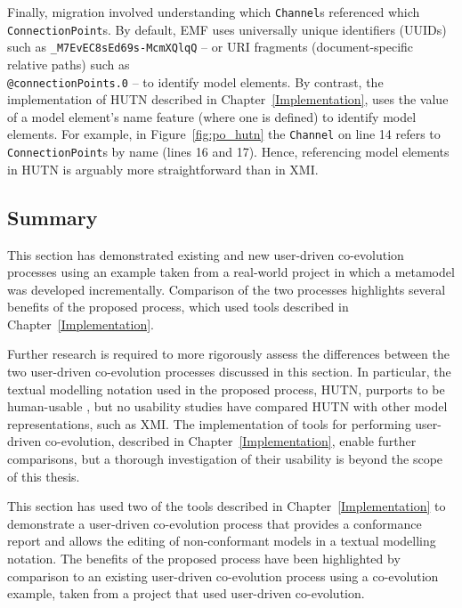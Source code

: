Finally, migration involved understanding which \texttt{Ch\-an\-n\-el}s referenced which \texttt{Co\-nn\-ec\-ti\-onPo\-in\-t}s.  By default, EMF uses universally unique identifiers (UUIDs) such as \texttt{\_M7EvEC8sEd69s-McmXQlqQ} -- or URI fragments (document-specific relative paths) such as \texttt{\\@co\-nn\-ec\-ti\-onPo\-in\-ts.0} -- to identify model elements. By contrast, the implementation of HUTN described in Chapter~\ref{Implementation}, uses the value of a model element's name feature (where one is defined) to identify model elements. For example, in Figure~\ref{fig:po_hutn} the \texttt{Ch\-an\-n\-el} on line 14 refers to \texttt{Co\-nn\-ec\-ti\-onPo\-in\-t}s by name (lines 16 and 17). Hence, referencing model elements in HUTN is arguably more straightforward than in XMI.


\subsection{Summary}
\label{subsec:user_driven_example_summary}
This section has demonstrated existing and new user-driven co-evolution processes using an example taken from a real-world project in which a metamodel was developed incrementally. Comparison of the two processes highlights several benefits of the proposed process, which used tools described in Chapter~\ref{Implementation}.


Further research is required to more rigorously assess the differences between the two user-driven co-evolution processes discussed in this section. In particular, the textual modelling notation used in the proposed process, HUTN, purports to be human-usable \cite{hutn}, but no usability studies have compared HUTN with other model representations, such as XMI. The implementation of tools for performing user-driven co-evolution, described in Chapter~\ref{Implementation}, enable further comparisons, but a thorough investigation of their usability is beyond the scope of this thesis.

This section has used two of the tools described in Chapter~\ref{Implementation} to demonstrate a user-driven co-evolution process that provides a conformance report and allows the editing of non-conformant models in a textual modelling notation. The benefits of the proposed process have been highlighted by comparison to an existing user-driven co-evolution process using a co-evolution example, taken from a project that used user-driven co-evolution.